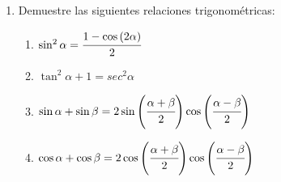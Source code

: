 \documentclass[letterpaper,11pt]{article}
\begin{document}
\begin{enumerate}
\item Demuestre las siguientes relaciones trigonométricas:
    {
    \begin{multicols}{2}
        \begin{enumerate}
        \item $\sin^2\alpha = \cfrac{1 - \cos{(2\alpha)}}{2}$
        
        \item $\tan^2\alpha + 1 = sec^2\alpha$
        
        \columnbreak
        
        \item $\sin\alpha + \sin\beta = 2\sin{\left(\cfrac{\alpha+\beta}{2}\right)}\cos{\left(\cfrac{\alpha-\beta}{2}\right)}$
        
        \item $\cos\alpha+\cos\beta = 2\cos{\left(\cfrac{\alpha+\beta}{2}\right)}\cos{\left(\cfrac{\alpha-\beta}{2}\right)}$
    \end{enumerate}
    \end{multicols}
    }


\end{enumerate}
\end{document}
